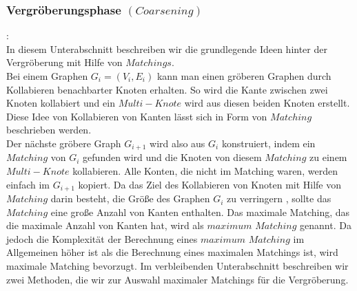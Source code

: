 \documentclass[runningheads]{llncs}
\begin{document}
\subsubsection{Vergröberungsphase $(Coarsening)$}:\\
In diesem Unterabschnitt beschreiben wir die grundlegende Ideen hinter der Vergröberung mit Hilfe von $Matchings$.\\ 
Bei einem Graphen $G_i = (V_i, E_i)$ kann man einen gröberen Graphen durch Kollabieren benachbarter Knoten erhalten. So wird die Kante zwischen zwei Knoten kollabiert und ein $Multi-Knote$
wird aus diesen beiden Knoten erstellt. Diese Idee von Kollabieren von Kanten lässt sich in Form von $Matching$ beschrieben werden. \\
Der nächste gröbere Graph $G_{i+1}$ wird also aus $G_i$ konstruiert, indem ein $Matching$ von $G_i$ gefunden wird und die Knoten von diesem $Matching$ zu einem $Multi-Knote$ kollabieren. Alle Konten, die nicht im Matching waren, werden einfach im $G_{i+1}$ kopiert. Da das Ziel des Kollabieren von Knoten mit Hilfe von $Matching$ darin besteht, die Größe des Graphen $G_i$ zu verringern
, sollte das $Matching$ eine große Anzahl von Kanten enthalten. 
 Das maximale Matching, das
die maximale Anzahl von Kanten hat, wird als $maximum$ $Matching$ genannt. Da jedoch die Komplexität der Berechnung eines $maximum$ $Matching$ im Allgemeinen höher ist als die Berechnung eines maximalen Matchings ist, wird maximale Matching bevorzugt. Im verbleibenden Unterabschnitt beschreiben wir zwei Methoden, die wir zur Auswahl maximaler
Matchings für die Vergröberung. 
\end{document}

